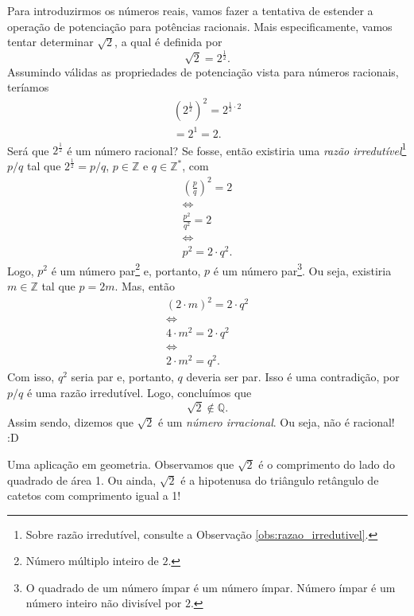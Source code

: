 Para introduzirmos os números reais, vamos fazer a tentativa de estender a operação de potenciação para potências racionais. Mais especificamente, vamos tentar determinar $\sqrt{2}$, a qual é definida por
\begin{equation}
  \sqrt{2} = 2^{\frac{1}{2}}.
\end{equation}
Assumindo válidas as propriedades de potenciação vista para números racionais, teríamos
\begin{gather}
  \left(2^{\frac{1}{2}}\right)^2 = 2^{\frac{1}{2}\cdot 2} \\
  = 2^1 = 2.
\end{gather}
Será que $2^{\frac{1}{2}}$ é um número racional? Se fosse, então existiria uma \emph{razão irredutível}\footnote{Sobre razão irredutível, consulte a Observação \ref{obs:razao_irredutivel}.} $p/q$ tal que $2^{\frac{1}{2}} = p/q$, $p\in\mathbb{Z}$ e $q\in\mathbb{Z}^*$, com
\begin{gather}
  \left(\frac{p}{q}\right)^2 = 2 \\
  \Leftrightarrow\nonumber\\
  \frac{p^2}{q^2} = 2 \\
  \Leftrightarrow\nonumber\\
  p^2 = 2\cdot q^2.
\end{gather}
Logo, $p^2$ é um número par\footnote{Número múltiplo inteiro de $2$.} e, portanto, $p$ é um número par\footnote{O quadrado de um número ímpar é um número ímpar. Número ímpar é um número inteiro não divisível por $2$.}. Ou seja, existiria $m\in\mathbb{Z}$ tal que $p = 2m$. Mas, então
\begin{gather}
  (2\cdot m)^2 = 2\cdot q^2 \\
  \Leftrightarrow\nonumber\\
  4\cdot m^2 = 2\cdot q^2 \\
  \Leftrightarrow\nonumber\\
  2\cdot m^2 = q^2.
\end{gather}
Com isso, $q^2$ seria par e, portanto, $q$ deveria ser par. Isso é uma contradição, por $p/q$ é uma razão irredutível. Logo, concluímos que
\begin{equation}
  \sqrt{2}\not\in\mathbb{Q}.
\end{equation}
Assim sendo, dizemos que $\sqrt{2}$ é um \emph{número irracional}. Ou seja, não é racional! :D

\begin{obs}
  Uma aplicação em geometria. Observamos que $\sqrt{2}$ é o comprimento do lado do quadrado de área 1. Ou ainda, $\sqrt{2}$ é a hipotenusa do triângulo retângulo de catetos com comprimento igual a 1!
\end{obs}

